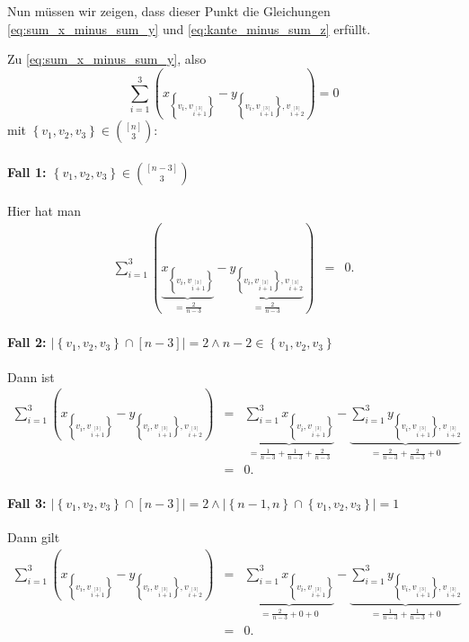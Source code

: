 \documentclass[10p,a4paper,BCOR = 12mm, DIV=15]{scrbook}
\begin{document}
{\begin{bew}
Nun müssen wir zeigen, dass dieser Punkt die Gleichungen \eqref{eq:sum_x_minus_sum_y} und \eqref{eq:kante_minus_sum_z} erfüllt.

Zu \eqref{eq:sum_x_minus_sum_y}, also
\begin{displaymath}
\sum_{i=1}^3 \left(x_{\left\{v_{i}, v_{i \stackrel{\left[3\right]}{+} 1}\right\}} - y_{\left\{v_{i}, v_{i \stackrel{\left[3\right]}{+} 1}\right\}, v_{i \stackrel{\left[3\right]}{+} 2}}\right) = 0
\end{displaymath}
mit $\left\{v_1, v_2, v_3\right\} \in {\left[n\right] \choose 3}$:

\paragraph{Fall 1: $\left\{v_1, v_2, v_3\right\} \in {\left[n-3\right] \choose 3}$} Hier hat man
\begin{eqnarray*}
\sum_{i=1}^3 \left(\underbrace{x_{\left\{v_{i}, v_{i \stackrel{\left[3\right]}{+} 1}\right\}}}_{= \frac{2}{n-3}} - \underbrace{y_{\left\{v_{i}, v_{i \stackrel{\left[3\right]}{+} 1}\right\}, v_{i \stackrel{\left[3\right]}{+} 2}}}_{= \frac{2}{n-3}}\right) & = & 0.
\end{eqnarray*}

\paragraph{Fall 2: $\left|\left\{v_1, v_2, v_3\right\} \cap \left[n-3\right]\right| = 2 \wedge n-2 \in \left\{v_1, v_2, v_3\right\}$} Dann ist
\begin{eqnarray*}
\sum_{i=1}^3 \left(x_{\left\{v_{i}, v_{i \stackrel{\left[3\right]}{+} 1}\right\}} - y_{\left\{v_{i}, v_{i \stackrel{\left[3\right]}{+} 1}\right\}, v_{i \stackrel{\left[3\right]}{+} 2}}\right) & = & \underbrace{\sum_{i=1}^3 x_{\left\{v_{i}, v_{i \stackrel{\left[3\right]}{+} 1}\right\}}}_{= \frac{1}{n-3} + \frac{1}{n-3} + \frac{2}{n-3}} - \underbrace{\sum_{i=1}^3 y_{\left\{v_{i}, v_{i \stackrel{\left[3\right]}{+} 1}\right\}, v_{i \stackrel{\left[3\right]}{+} 2}}}_{= \frac{2}{n-3} + \frac{2}{n-3} + 0 } \\
& = & 0.
\end{eqnarray*}

\paragraph{Fall 3: $\left|\left\{v_1, v_2, v_3\right\} \cap \left[n-3\right]\right| = 2 \wedge \left|\left\{n-1, n\right\} \cap \left\{v_1, v_2, v_3\right\}\right| = 1$} Dann gilt
\begin{eqnarray*}
\sum_{i=1}^3 \left(x_{\left\{v_{i}, v_{i \stackrel{\left[3\right]}{+} 1}\right\}} - y_{\left\{v_{i}, v_{i \stackrel{\left[3\right]}{+} 1}\right\}, v_{i \stackrel{\left[3\right]}{+} 2}}\right) & = & \underbrace{\sum_{i=1}^3 x_{\left\{v_{i}, v_{i \stackrel{\left[3\right]}{+} 1}\right\}}}_{= \frac{2}{n-3} + 0 + 0} - \underbrace{\sum_{i=1}^3 y_{\left\{v_{i}, v_{i \stackrel{\left[3\right]}{+} 1}\right\}, v_{i \stackrel{\left[3\right]}{+} 2}}}_{= \frac{1}{n-3} + \frac{1}{n-3} + 0 } \\
& = & 0.
\end{eqnarray*}


\end{bew}}
\end{document}
